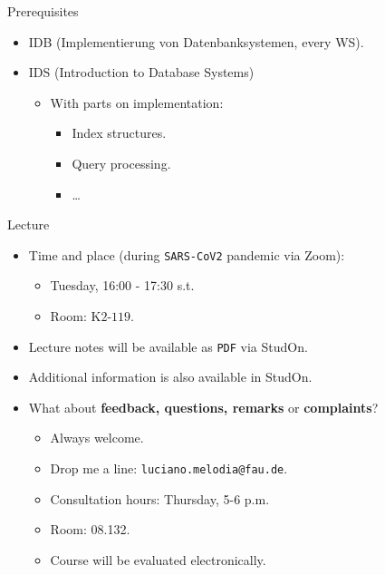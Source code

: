 \documentclass[aspectratio=169,t]{beamer}
\begin{document}
  { %
    \begin{frame}{Prerequisites}
      \begin{itemize}
          \item IDB (Implementierung von Datenbanksystemen, every WS).
          \item IDS (Introduction to Database Systems)
              \begin{itemize}
                  \item With parts on implementation:
                    \begin{itemize}
                        \item Index structures.
                        \item Query processing.
                        \item \ldots
                    \end{itemize}
              \end{itemize}
      \end{itemize}
    \end{frame}
  }

  { %
    \begin{frame}{Lecture}
      \begin{itemize}
          \item Time and place (during \texttt{SARS-CoV2} pandemic via Zoom):
              \begin{itemize}
                  \item Tuesday, 16:00 - 17:30 s.t.
                  \item Room: K$2$-$119$.
              \end{itemize}
          \item Lecture notes will be available as \texttt{PDF} via StudOn.
          \item Additional information is also available in StudOn.
          \item What about \textbf{feedback, questions, remarks} or \textbf{complaints}?
              \begin{itemize}
                  \item Always welcome.
                  \item Drop me a line: \texttt{luciano.melodia@fau.de}.
                  \item Consultation hours: Thursday, 5-6 p.m.
                  \item Room: 08.132.
                  \item Course will be evaluated electronically.
              \end{itemize}
      \end{itemize}
    \end{frame}
  }
\end{document}
